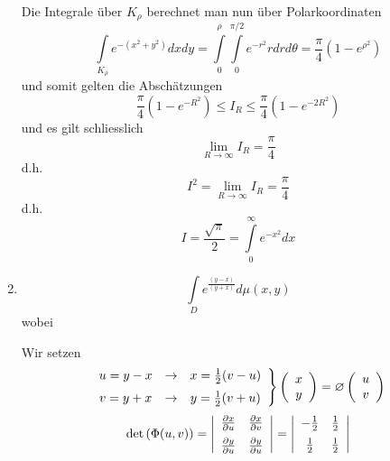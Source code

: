\begin{enumerate}
Die Integrale über $K_\rho$ berechnet man nun über Polarkoordinaten
\[\int\limits_{{K_\rho }} {{e^{ - \left( {{x^2} + {y^2}} \right)}}dxdy}  = \int\limits_0^\rho  {\int\limits_0^{\pi /2} {{e^{ - {r^2}}}rdrd\theta } }  = \frac{\pi }{4}\left( {1 - {e^{{\rho ^2}}}} \right)\]
und somit gelten die Abschätzungen
\[\frac{\pi }{4}\left( {1 - {e^{ - {R^2}}}} \right) \le {I_R} \le \frac{\pi }{4}\left( {1 - {e^{ - 2{R^2}}}} \right)\]
und es gilt schliesslich
\[\mathop {\lim }\limits_{R \to \infty } {I_R} = \frac{\pi }{4}\]
d.h. \[{I^2} = \mathop {\lim }\limits_{R \to \infty } {I_R} = \frac{\pi }{4}\]
d.h. \[I = \frac{{\sqrt \pi  }}{2} = \int\limits_0^\infty  {{e^{ - {x^2}}}dx} \]
\item \[\int\limits_D e^{\frac{(y-x)}{(y+x)}}d\mu(x,y)\]
wobei 
\begin{center}
\end{center}
Wir setzen 
\[\left. {\begin{array}{*{20}{c}}
{u = y - x}& \to &{x = \frac{1}{2}(v - u)}\vspace{2mm}\\
{v = y + x}& \to &{y = \frac{1}{2}(v + u)}
\end{array}} \right\}\left( {\begin{array}{*{20}{c}}
x\\
y
\end{array}} \right) = \varnothing \left( {\begin{array}{*{20}{c}}
u\\
v
\end{array}} \right)\]
\[\det \left( {\Phi (u,v)} \right) = \left| {\begin{array}{*{20}{c}}
{\frac{{\partial x}}{{\partial u}}}&{\frac{{\partial x}}{{\partial v}}}\vspace{2mm}\\
{\frac{{\partial y}}{{\partial u}}}&{\frac{{\partial y}}{{\partial u}}}
\end{array}} \right| = \left| {\begin{array}{*{20}{c}}
{ - \frac{1}{2}}&{\frac{1}{2}}\vspace{2mm}\\
{\frac{1}{2}}&{\frac{1}{2}}
\end{array}} \right|\]


\end{enumerate}
